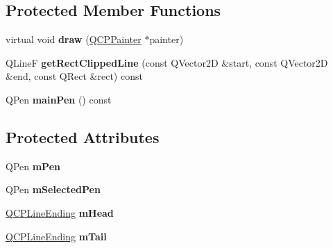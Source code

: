\subsection*{Protected Member Functions}
\begin{DoxyCompactItemize}
\item 
\hypertarget{classQCPItemLine_a1fc045dd33919f8006df0692aeb0e84a}{virtual void {\bfseries draw} (\hyperlink{classQCPPainter}{Q\-C\-P\-Painter} $\ast$painter)}\label{classQCPItemLine_a1fc045dd33919f8006df0692aeb0e84a}

\item 
\hypertarget{classQCPItemLine_a36e8620019a221ccea4357f0287b81c2}{Q\-Line\-F {\bfseries get\-Rect\-Clipped\-Line} (const Q\-Vector2\-D \&start, const Q\-Vector2\-D \&end, const Q\-Rect \&rect) const }\label{classQCPItemLine_a36e8620019a221ccea4357f0287b81c2}

\item 
\hypertarget{classQCPItemLine_a7b5bc4ebacb55774b87c91b308ca7912}{Q\-Pen {\bfseries main\-Pen} () const }\label{classQCPItemLine_a7b5bc4ebacb55774b87c91b308ca7912}

\end{DoxyCompactItemize}
\subsection*{Protected Attributes}
\begin{DoxyCompactItemize}
\item 
\hypertarget{classQCPItemLine_abbb544d5bb927dfe4e81a7f3ca4c65ac}{Q\-Pen {\bfseries m\-Pen}}\label{classQCPItemLine_abbb544d5bb927dfe4e81a7f3ca4c65ac}

\item 
\hypertarget{classQCPItemLine_aff858ad6dde3b90024814ca4b116f278}{Q\-Pen {\bfseries m\-Selected\-Pen}}\label{classQCPItemLine_aff858ad6dde3b90024814ca4b116f278}

\item 
\hypertarget{classQCPItemLine_a51603f28ab7ddb1c1a95ea384791d3ed}{\hyperlink{classQCPLineEnding}{Q\-C\-P\-Line\-Ending} {\bfseries m\-Head}}\label{classQCPItemLine_a51603f28ab7ddb1c1a95ea384791d3ed}

\item 
\hypertarget{classQCPItemLine_ab8ed61dfe15bbb1cbf9b95eae95e242f}{\hyperlink{classQCPLineEnding}{Q\-C\-P\-Line\-Ending} {\bfseries m\-Tail}}\label{classQCPItemLine_ab8ed61dfe15bbb1cbf9b95eae95e242f}

\end{DoxyCompactItemize}

